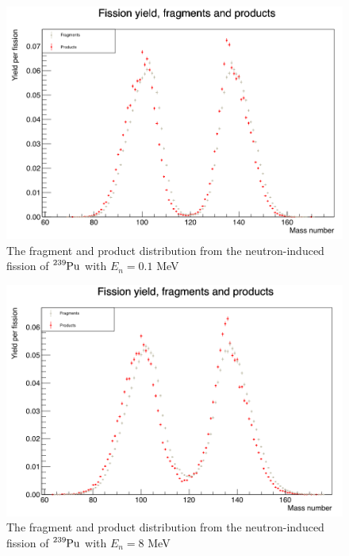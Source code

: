 \documentclass[]{article}
\begin{document}
\begin{figure} [H]
	\centering
	\includegraphics[scale=0.36]{Pu239_0_1_fragment_product.png}
	\caption{The fragment and product distribution from the neutron-induced fission of $\ce{^{239}Pu}$ with $E_n = 0.1$ MeV}
	\label{fig:Pu239_0_1_fragment_product}
\end{figure}

\begin{figure} [H]
	\centering
	\includegraphics[scale=0.36]{Pu239_8_fragment_product.png}
	\caption{The fragment and product distribution from the neutron-induced fission of $\ce{^{239}Pu}$ with $E_n = 8$ MeV}
	\label{fig:Pu239_8_fragment_product}
\end{figure}
\end{document}
